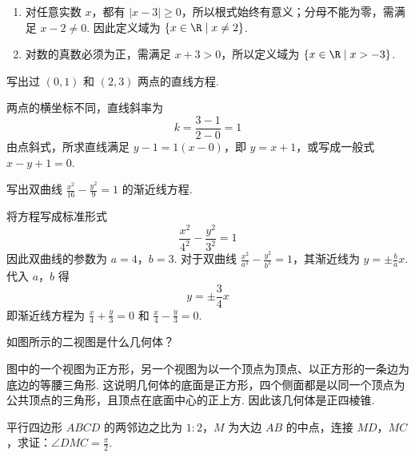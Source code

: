 \begin{solution}
\begin{enumerate}
\item 对任意实数 \(x\)，都有 \(\lvert x-3\rvert\geqslant0\)，所以根式始终有意义；分母不能为零，需满足 \(x-2\ne0\). 因此定义域为 \(\{x\in\R\mid x\ne2\}\).

\item 对数的真数必须为正，需满足 \(x+3>0\)，所以定义域为 \(\{x\in\R\mid x>-3\}\).
\end{enumerate}
\end{solution}

\begin{problem}
写出过 \((0,1)\) 和 \((2,3)\) 两点的直线方程.
\end{problem}

\begin{solution}
两点的横坐标不同，直线斜率为
\[
k=\frac{3-1}{2-0}=1
\]
由点斜式，所求直线满足 \(y-1=1\left( x-0 \right)\)，即
\(y=x+1\)，或写成一般式 \(x-y+1=0\).
\end{solution}

\begin{problem}
写出双曲线 \(\frac{x^2}{16}-\frac{y^2}{9}=1\) 的渐近线方程.
\end{problem}

\begin{solution}
将方程写成标准形式
\[
\frac{x^2}{4^2}-\frac{y^2}{3^2}=1
\]
因此双曲线的参数为 \(a=4\)，\(b=3\). 对于双曲线 \(\frac{x^2}{a^2}-\frac{y^2}{b^2}=1\)，其渐近线为 \(y=\pm\frac{b}{a}x\). 代入 \(a\)，\(b\) 得
\[
y=\pm\frac{3}{4}x
\]
即渐近线方程为 \(\frac{x}{4}+\frac{y}{3}=0\) 和 \(\frac{x}{4}-\frac{y}{3}=0\).
\end{solution}

\begin{problem}
如图所示的二视图是什么几何体？

\end{problem}

\begin{solution}
图中的一个视图为正方形，另一个视图为以一个顶点为顶点、以正方形的一条边为底边的等腰三角形. 这说明几何体的底面是正方形，四个侧面都是以同一个顶点为公共顶点的三角形，且顶点在底面中心的正上方. 因此该几何体是正四棱锥.
\end{solution}

\begin{problem}
平行四边形 \(ABCD\) 的两邻边之比为 \(1:2\)，\(M\) 为大边 \(AB\) 的中点，连接 \(MD\)，\(MC\)，求证：\(\angle DMC=\frac{\pi}{2}\).
\end{problem}

